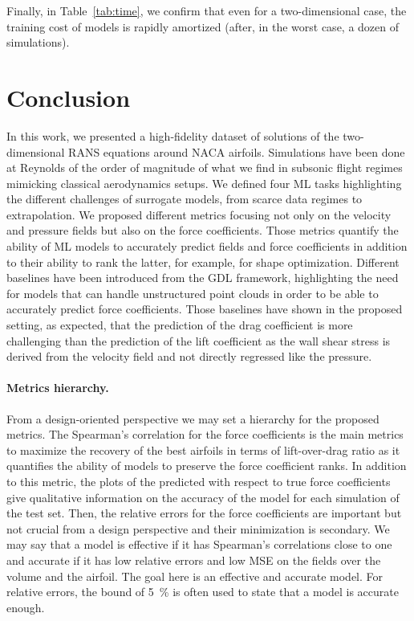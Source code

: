 Finally, in Table~\ref{tab:time}, we confirm that even for a two-dimensional case, the training cost of models is rapidly amortized (after, in the worst case, a dozen of simulations).

\section{Conclusion}\label{sec:conclusion}
In this work, we presented a high-fidelity dataset of solutions of the two-dimensional RANS equations around NACA airfoils. Simulations have been done at Reynolds of the order of magnitude of what we find in subsonic flight regimes mimicking classical aerodynamics setups. We defined four ML tasks highlighting the different challenges of surrogate models, from scarce data regimes to extrapolation. We proposed different metrics focusing not only on the velocity and pressure fields but also on the force coefficients. Those metrics quantify the ability of ML models to accurately predict fields and force coefficients in addition to their ability to rank the latter, for example, for shape optimization. Different baselines have been introduced from the GDL framework, highlighting the need for models that can handle unstructured point clouds in order to be able to accurately predict force coefficients. Those baselines have shown in the proposed setting, as expected, that the prediction of the drag coefficient is more challenging than the prediction of the lift coefficient as the wall shear stress is derived from the velocity field and not directly regressed like the pressure.

\paragraph{Metrics hierarchy.} From a design-oriented perspective we may set a hierarchy for the proposed metrics. The Spearman's correlation for the force coefficients is the main metrics to maximize the recovery of the best airfoils in terms of lift-over-drag ratio as it quantifies the ability of models to preserve the force coefficient ranks. In addition to this metric, the plots of the predicted with respect to true force coefficients give qualitative information on the accuracy of the model for each simulation of the test set. Then, the relative errors for the force coefficients are important but not crucial from a design perspective and their minimization is secondary. We may say that a model is effective if it has Spearman's correlations close to one and accurate if it has low relative errors and low MSE on the fields over the volume and the airfoil. The goal here is an effective and accurate model. For relative errors, the bound of \SI{5}{\percent} is often used to state that a model is accurate enough.


